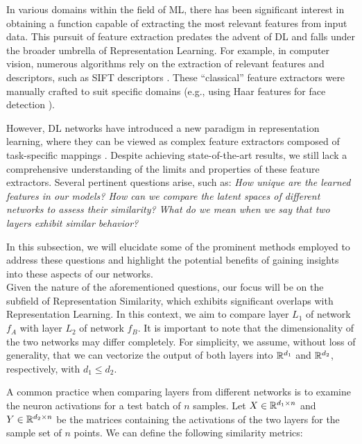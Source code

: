 \documentclass[../main.tex]{subfiles}
\begin{document}
In various domains within the field of ML, there has been significant interest in obtaining a function capable of extracting the most relevant features from input data. This pursuit of feature extraction predates the advent of DL and falls under the broader umbrella of Representation Learning. For example, in computer vision, numerous algorithms rely on the extraction of relevant features and descriptors, such as SIFT descriptors \cite{gonzalez_digital_2002}. These ``classical'' feature extractors were manually crafted to suit specific domains (e.g., using Haar features for face detection \cite{viola_rapid_2001}).

However, DL networks have introduced a new paradigm in representation learning, where they can be viewed as complex feature extractors composed of task-specific mappings \cite{moschella_relative_2022}. Despite achieving state-of-the-art results, we still lack a comprehensive understanding of the limits and properties of these feature extractors. Several pertinent questions arise, such as: \textit{How unique are the learned features in our models? How can we compare the latent spaces of different networks to assess their similarity? What do we mean when we say that two layers exhibit similar behavior?}

In this subsection, we will elucidate some of the prominent methods employed to address these questions and highlight the potential benefits of gaining insights into these aspects of our networks.\\

Given the nature of the aforementioned questions, our focus will be on the subfield of Representation Similarity, which exhibits significant overlaps with Representation Learning. In this context, we aim to compare layer $L_1$ of network $f_A$ with layer $L_2$ of network $f_B$. It is important to note that the dimensionality of the two networks may differ completely. For simplicity, we assume, without loss of generality, that we can vectorize the output of both layers into $\mathbb{R}^{d_1}$ and $\mathbb{R}^{d_2}$, respectively, with $d_1 \leq d_2$.

A common practice when comparing layers from different networks is to examine the neuron activations for a test batch of $n$ samples. Let $X\in \mathbb{R}^{d_1 \times n}$ and $Y \in \mathbb{R}^{d_2 \times n}$ be the matrices containing the activations of the two layers for the sample set of $n$ points. We can define the following similarity metrics:
\end{document}
